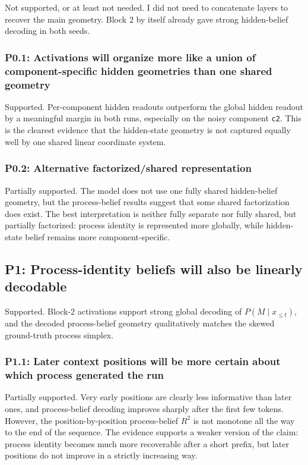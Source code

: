 \documentclass[11pt]{article}
\begin{document}
Not supported, or at least not needed. I did not need to concatenate layers to recover the main geometry. Block 2 by itself already gave strong hidden-belief decoding in both seeds.

\subsubsection*{P0.1: Activations will organize more like a union of component-specific hidden geometries than one shared geometry}

Supported. Per-component hidden readouts outperform the global hidden readout by a meaningful margin in both runs, especially on the noisy component \texttt{c2}. This is the clearest evidence that the hidden-state geometry is not captured equally well by one shared linear coordinate system.

\subsubsection*{P0.2: Alternative factorized/shared representation}

Partially supported. The model does not use one fully shared hidden-belief geometry, but the process-belief results suggest that some shared factorization does exist. The best interpretation is neither fully separate nor fully shared, but partially factorized: process identity is represented more globally, while hidden-state belief remains more component-specific.

\subsection{P1: Process-identity beliefs will also be linearly decodable}

Supported. Block-2 activations support strong global decoding of $P(M \mid x_{\le t})$, and the decoded process-belief geometry qualitatively matches the skewed ground-truth process simplex.

\subsubsection*{P1.1: Later context positions will be more certain about which process generated the run}

Partially supported. Very early positions are clearly less informative than later ones, and process-belief decoding improves sharply after the first few tokens. However, the position-by-position process-belief $R^2$ is not monotone all the way to the end of the sequence. The evidence supports a weaker version of the claim: process identity becomes much more recoverable after a short prefix, but later positions do not improve in a strictly increasing way.
\end{document}
